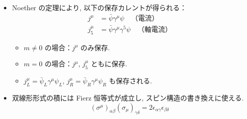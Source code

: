 \documentclass[a4paper,12pt]{article}
\begin{document}
\begin{itemize}
  \item Noether の定理により, 以下の保存カレントが得られる：
  \begin{align*}
    j^\mu &= \bar{\psi} \gamma^\mu \psi \quad \text{（電流）} \\
    j_5^\mu &= \bar{\psi} \gamma^\mu \gamma^5 \psi \quad \text{（軸電流）}
  \end{align*}
  \begin{itemize}
    \item $m \neq 0$ の場合：$j^\mu$ のみ保存.
    \item $m = 0$ の場合：$j^\mu$, $j_5^\mu$ ともに保存.
    \item $j^\mu_L = \bar{\psi}_L \gamma^\mu \psi_L$, $j^\mu_R = \bar{\psi}_R \gamma^\mu \psi_R$ も保存される.
  \end{itemize}

  \item 双線形形式の積には Fierz 恒等式が成立し, スピン構造の書き換えに使える.
  \begin{equation*}
    (\sigma^\mu)_{\alpha\beta} (\sigma_\mu)_{\gamma\delta} = 2 \epsilon_{\alpha\gamma} \epsilon_{\beta\delta}
  \end{equation*}
\end{itemize}

\newpage
\color{black}
\end{document}
